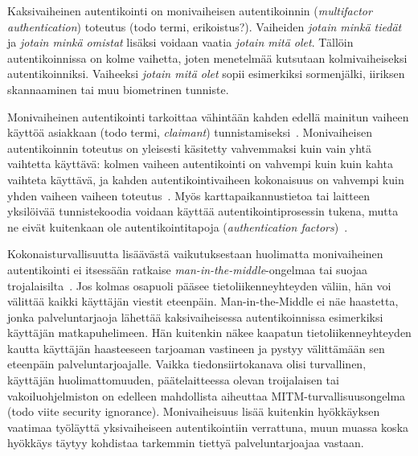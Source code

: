 \documentclass[finnish,gradu]{tktltiki}
\begin{document}
  Kaksivaiheinen autentikointi on monivaiheisen autentikoinnin (\emph{multifactor authentication}) toteutus (todo termi, erikoistus?).
  Vaiheiden \emph{jotain minkä tiedät} ja \emph{jotain minkä omistat} lisäksi voidaan vaatia \emph{jotain mitä olet}. Tällöin autentikoinnissa on kolme vaihetta, joten menetelmää kutsutaan kolmivaiheiseksi autentikoinniksi. Vaiheeksi \emph{jotain mitä olet} sopii esimerkiksi sormenjälki, iiriksen skannaaminen tai muu biometrinen tunniste.

  Monivaiheinen autentikointi tarkoittaa vähintään kahden edellä mainitun vaiheen käyttöä asiakkaan (todo termi, \emph{claimant}) tunnistamiseksi~\cite{NIST_SP800-63-1}. Monivaiheisen autentikoinnin toteutus on yleisesti käsitetty vahvemmaksi kuin vain yhtä vaihtetta käyttävä: kolmen vaiheen autentikointi on vahvempi kuin kuin kahta vaihteta käyttävä, ja kahden autentikointivaiheen kokonaisuus on vahvempi kuin yhden vaiheen vaiheen toteutus~\cite{NIST_SP800-63-1}. Myös karttapaikannustietoa tai laitteen yksilöivää tunnistekoodia voidaan käyttää autentikointiprosessin tukena, mutta ne eivät kuitenkaan ole autentikointitapoja (\emph{authentication factors})~\cite{NIST_SP800-63-1}.

  Kokonaisturvallisuutta lisäävästä vaikutuksestaan huolimatta monivaiheinen autentikointi ei itsessään ratkaise \emph{man-in-the-middle}-ongelmaa tai suojaa trojalaisilta~\cite{schneier_2factor_2005}. Jos kolmas osapuoli pääsee tietoliikenneyhteyden väliin, hän voi välittää kaikki käyttäjän viestit eteenpäin. Man-in-the-Middle ei näe haastetta, jonka palveluntarjaoja lähettää kaksivaiheisessa autentikoinnissa esimerkiksi käyttäjän matkapuhelimeen. Hän kuitenkin näkee kaapatun tietoliikenneyhteyden kautta käyttäjän haasteeseen tarjoaman vastineen ja pystyy välittämään sen eteenpäin palveluntarjoajalle. Vaikka tiedonsiirtokanava olisi turvallinen, käyttäjän huolimattomuuden, päätelaitteessa olevan troijalaisen tai vakoiluohjelmiston on edelleen mahdollista aiheuttaa MITM-turvallisuusongelma~\cite{schneier_2factor_2012} (todo viite security ignorance). Monivaiheisuus lisää kuitenkin hyökkäyksen vaatimaa työläyttä yksivaiheiseen autentikointiin verrattuna, muun muassa koska hyökkäys täytyy kohdistaa tarkemmin tiettyä palveluntarjoajaa vastaan.


\end{document}
